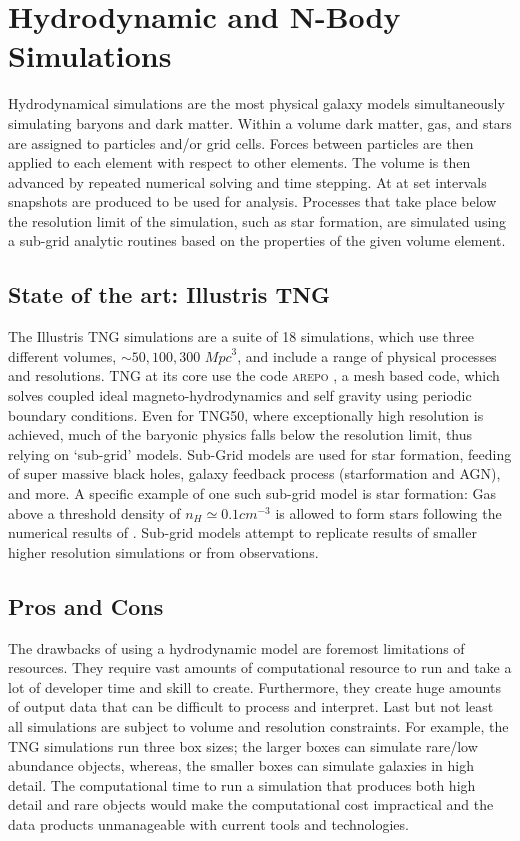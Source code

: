 \section{Hydrodynamic and N-Body Simulations}
\label{sec:Hydro}
Hydrodynamical simulations are the most physical galaxy models simultaneously simulating baryons and dark matter. Within a volume dark matter, gas, and stars are assigned to particles and/or grid cells. Forces between particles are then applied to each element with respect to other elements. The volume is then advanced by repeated numerical solving and time stepping. At at set intervals snapshots are produced to be used for analysis. Processes that take place below the resolution limit of the simulation, such as star formation, are simulated using a sub-grid analytic routines based on the properties of the given volume element.

\subsection{State of the art: Illustris TNG}
The Illustris TNG simulations are a suite of 18 simulations, which use three different volumes, $\sim 50, 100, 300$ ${Mpc}^{3}$, and include a range of physical processes and resolutions. TNG at its core use the code \textsc{arepo} \citep{Springel2010EMesh}, a mesh based code, which solves coupled ideal magneto-hydrodynamics and self gravity using periodic boundary conditions. Even for TNG50, where exceptionally high resolution is achieved, much of the baryonic physics falls below the resolution limit, thus relying on `sub-grid' models. Sub-Grid models are used for star formation, feeding of super massive black holes, galaxy feedback process (starformation and AGN), and more. A specific example of one such sub-grid model is star formation: Gas above a threshold density of $n_H \simeq 0.1cm^{-3}$ is allowed to form stars following the numerical results of \citet{Springel2003CosmologicalFormation}. Sub-grid models attempt to replicate results of smaller higher resolution simulations or from observations. 

\subsection{Pros and Cons}
The drawbacks of using a hydrodynamic model are foremost limitations of resources. They require vast amounts of computational resource to run and take a lot of developer time and skill to create. Furthermore, they create huge amounts of output data that can be difficult to process and interpret. Last but not least all simulations are subject to volume and resolution constraints. For example, the TNG simulations run three box sizes; the larger boxes can simulate rare/low abundance objects, whereas, the smaller boxes can simulate galaxies in high detail. The computational time to run a simulation that produces both high detail and rare objects would make the computational cost impractical and the data products unmanageable with current tools and technologies. 

